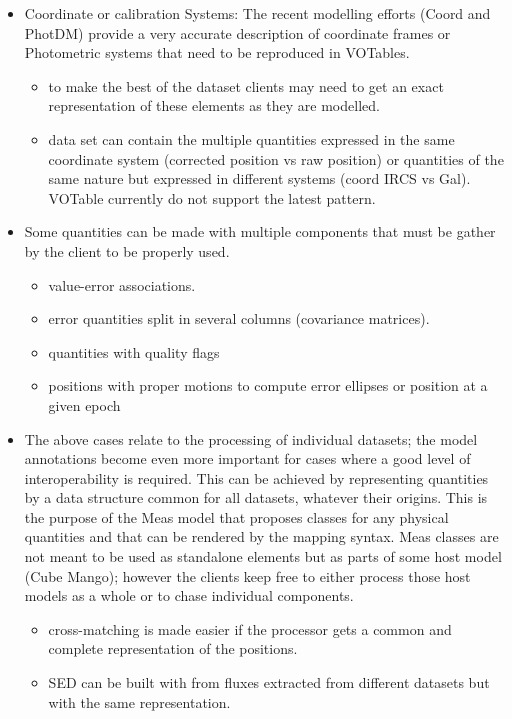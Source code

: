 \begin{itemize}
  \item Coordinate or calibration Systems: The recent modelling efforts (Coord and PhotDM) provide a very accurate description of coordinate frames or Photometric systems that need to be reproduced in VOTables.
  \begin{itemize}
    \item to make the best of the dataset  clients may need to get an exact representation of these elements as they are modelled.
    \item data set can contain the multiple quantities expressed in the same coordinate system (corrected position vs raw position) or 
             quantities of the same nature but expressed in different systems (coord IRCS vs Gal). VOTable currently do not support the latest pattern.
  \end{itemize} 
  
  \item Some quantities can be made with multiple components that must be gather by the client to be properly used.
  \begin{itemize}
    \item value-error associations. 
    \item error quantities split in several columns (covariance matrices). 
    \item quantities with quality flags
    \item positions with proper motions to compute error ellipses or position at a given epoch
  \end{itemize} 

  \item The above cases relate to the processing of individual datasets; the model annotations become even more important for cases where a good level of interoperability is required. 
           This can be achieved by representing quantities by a data structure common for all datasets, whatever their origins. This is the purpose of the Meas model that proposes classes for 
           any physical quantities and that can be rendered by the mapping syntax. Meas classes are not meant to be used as standalone elements but as parts of some host model (Cube Mango);
           however the clients keep free to either process those host models as a whole or to chase individual components.
    \begin{itemize}
      \item cross-matching is made easier if the processor gets a common and complete representation of the positions.
      \item SED can be built with from fluxes extracted from different datasets but with the same representation.
   \end{itemize}          


\end{itemize}
